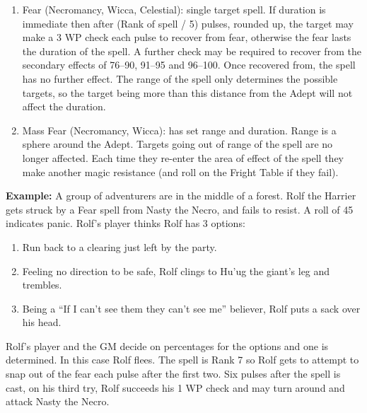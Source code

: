 \begin{multicols}{3}
\begin{enumerate}
\item
{}
Fear (Necromancy, Wicca, Celestial): single target spell.  If duration
is immediate then after (Rank of spell / 5) pulses, rounded up, the
target may make a 3 \x WP check each pulse to recover from fear,
otherwise the fear lasts the duration of the spell.  A further check
may be required to recover from the secondary effects of 76--90,
91--95 and 96--100.  Once recovered from, the spell has no further
effect.  The range of the spell only determines the possible targets,
so the target being more than this distance from the Adept will not
affect the duration.

\item
{}
Mass Fear (Necromancy, Wicca): has set range and duration.  Range is a
sphere around the Adept.  Targets going out of range of the spell are
no longer affected.  Each time they re-enter the area of effect of the
spell they make another magic resistance (and roll on the Fright Table
if they fail).
\end{enumerate}

\textbf{Example:} A group of adventurers are in the middle of a forest.
Rolf the Harrier gets struck by a Fear spell from Nasty the Necro, and
fails to resist.  A roll of 45 indicates panic.  Rolf's player thinks
Rolf has 3 options:

\begin{enumerate}
\setlength\itemsep{0pt}
\item Run back to a clearing just left by the party.
\item Feeling no direction to be safe, Rolf clings to Hu'ug the giant's leg
and trembles.
\item Being a ``If I can't see them they can't see me'' believer, Rolf puts
a sack over his head.
\end{enumerate}

Rolf's player and the GM decide on percentages for the options and one
is determined.  In this case Rolf flees.  The spell is Rank 7 so Rolf
gets to attempt to snap out of the fear each pulse after the first
two.  Six pulses after the spell is cast, on his third try, Rolf
succeeds his 1 \x WP check and may turn around and attack Nasty the
Necro.

\raggedcolumns
\end{multicols}
